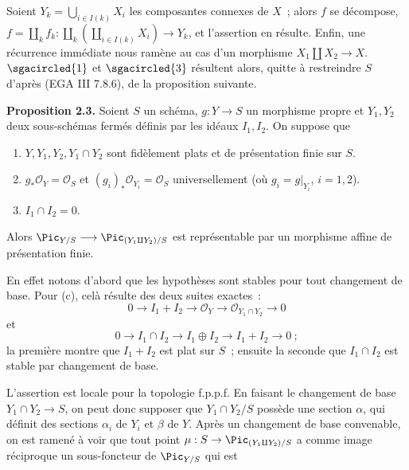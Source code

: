 Soient \(Y_k=\bigcup_{i\in I(k)}X_i\) les composantes connexes de \(X\)~; alors \(f\) se décompose, \(f=\coprod_k f_k:\coprod_k(\coprod_{i\in I(k)}X_i)\longrightarrow Y_k\), et l'assertion en résulte. Enfin, une récurrence immédiate nous ramène au cas d'un morphisme \(X_1\amalg X_2\to X\). \(\sgacircled{1}\) et \(\sgacircled{3}\) résultent alors, quitte à restreindre \(S\) d'après (EGA III 7.8.6), de la proposition suivante.

\textbf{Proposition 2.3.} Soient \(S\) un schéma, \(g:Y\to S\) un morphisme propre et \(Y_1,Y_2\) deux sous-schémas fermés définis par les idéaux \(I_1,I_2\). On suppose que
\begin{enumerate}[label=\alph*)]
\item \(Y,Y_1,Y_2,Y_1\cap Y_2\) sont fidèlement plats et de présentation finie sur \(S\).
\item \(g_*\mathcal O_Y=\mathcal O_S\) et \((g_i)_*\mathcal O_{Y_i}=\mathcal O_S\) universellement (où \(g_i=g|_{Y_i}\), \(i=1,2\)).
\item \(I_1\cap I_2=0\).
\end{enumerate}
Alors \(\Pic_{Y/S}\longrightarrow \Pic_{(Y_1\amalg Y_2)/S}\) est représentable par un morphisme affine de présentation finie.

En effet notons d'abord que les hypothèses sont stables pour tout changement de base. Pour (c), celà résulte des deux suites exactes~:
\[
  0\longrightarrow I_1+I_2\longrightarrow\mathcal O_Y
  \longrightarrow\mathcal O_{Y_1\cap Y_2}\longrightarrow0
\]
et
\[
  0\longrightarrow I_1\cap I_2\longrightarrow I_1\oplus I_2
  \longrightarrow I_1+I_2\longrightarrow0~;
\]
la première montre que \(I_1+I_2\) est plat sur \(S\)~; ensuite la seconde que \(I_1\cap I_2\) est stable par changement de base.

L'assertion est locale pour la topologie f.p.p.f. En faisant le changement de base \(Y_1\cap Y_2\to S\), on peut donc supposer que \(Y_1\cap Y_2/S\) possède une section \(\alpha\), qui définit des sections \(\alpha_i\) de \(Y_i\) et \(\beta\) de \(Y\). Après un changement de base convenable, on est ramené à voir que tout point \(\mu:S\to\Pic_{(Y_1\amalg Y_2)/S}\) a comme image réciproque un sous-foncteur de \(\Pic_{Y/S}\) qui est
